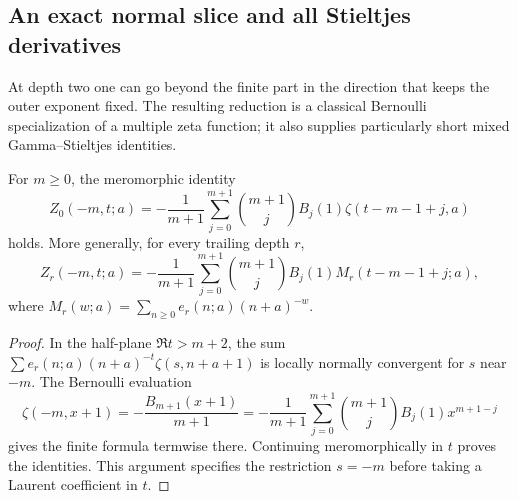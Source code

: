 \subsection{An exact normal slice and all Stieltjes derivatives}

At depth two one can go beyond the finite part in the direction that
keeps the outer exponent fixed. The resulting reduction is a classical
Bernoulli specialization of a multiple zeta function; it also supplies
particularly short mixed Gamma--Stieltjes identities.

\begin{theorem}
\label{h2:thm:slice}
For $m\ge0$, the meromorphic identity
\begin{equation}\label{h2:eq:slice}
 Z_0(-m,t;a)=-\frac1{m+1}\sum_{j=0}^{m+1}
       \binom{m+1}{j}B_j(1)\zeta(t-m-1+j,a)
\end{equation}
holds. More generally, for every trailing depth $r$,
\begin{equation}\label{h2:eq:slicedepth}
 Z_r(-m,t;a)=-\frac1{m+1}\sum_{j=0}^{m+1}
       \binom{m+1}{j}B_j(1)M_r(t-m-1+j;a),
\end{equation}
where $M_r(w;a)=\sum_{n\ge0}e_r(n;a)(n+a)^{-w}$.
\end{theorem}
\begin{proof}
In the half-plane $\Re t>m+2$, the sum
$\sum e_r(n;a)(n+a)^{-t}\zeta(s,n+a+1)$ is locally normally
convergent for $s$ near $-m$. The Bernoulli evaluation
\[
 \zeta(-m,x+1)=-\frac{B_{m+1}(x+1)}{m+1}
 =-\frac1{m+1}\sum_{j=0}^{m+1}
       \binom{m+1}{j}B_j(1)x^{m+1-j}
\]
gives the finite formula termwise there. Continuing meromorphically in
$t$ proves the identities. This argument specifies the restriction
$s=-m$ before taking a Laurent coefficient in $t$.
\end{proof}

